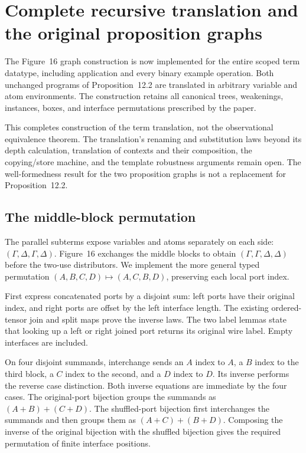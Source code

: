 \clearpage
\section{Complete recursive translation and the original proposition graphs}
\label{sec:complete-translation}
The Figure~16 graph construction is now implemented for the entire scoped
term datatype, including application and every binary example operation.
Both unchanged programs of Proposition~12.2 are translated in arbitrary
variable and atom environments. The construction retains all canonical
trees, weakenings, instances, boxes, and interface permutations prescribed
by the paper.

This completes construction of the term translation, not the observational
equivalence theorem. The translation's renaming and substitution laws beyond
its depth calculation, translation of contexts and their composition, the
copying/store machine, and the template robustness arguments remain open.
The well-formedness result for the two proposition graphs is not a replacement
for Proposition~12.2.

\subsection{The middle-block permutation}
The parallel subterms expose variables and atoms separately on each side:
$(\Gamma,\Delta,\Gamma,\Delta)$. Figure~16 exchanges the middle blocks to
obtain $(\Gamma,\Gamma,\Delta,\Delta)$ before the two-use distributors.
We implement the more general typed permutation
$(A,B,C,D)\mapsto(A,C,B,D)$, preserving each local port index.

First express concatenated ports by a disjoint sum: left ports have their
original index, and right ports are offset by the left interface length.
The existing ordered-tensor join and split maps prove the inverse laws.
The two label lemmas state that looking up a left or right joined port
returns its original wire label. Empty interfaces are included.




On four disjoint summands, interchange sends an $A$ index to $A$, a $B$
index to the third block, a $C$ index to the second, and a $D$ index to $D$.
Its inverse performs the reverse case distinction. Both inverse equations
are immediate by the four cases. The original-port bijection groups the
summands as $(A+B)+(C+D)$. The shuffled-port bijection first interchanges
the summands and then groups them as $(A+C)+(B+D)$. Composing the inverse
of the original bijection with the shuffled bijection gives the required
permutation of finite interface positions.

